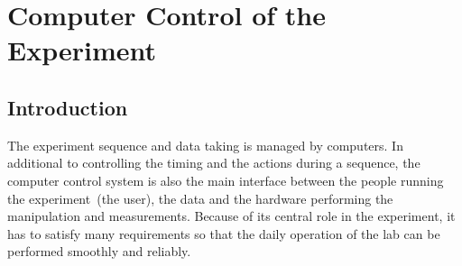 
\chapter{Computer Control of the Experiment}
\label{ch:computer-control}

\section{Introduction}
\label{ch:computer-control:introduction}

The experiment sequence and data taking is managed by computers.
In additional to controlling the timing and the actions during a sequence,
the computer control system is also the main interface
between the people running the experiment~(the user),
the data and the hardware performing the manipulation and measurements.
Because of its central role in the experiment,
it has to satisfy many requirements so that
the daily operation of the lab can be performed smoothly and reliably.
